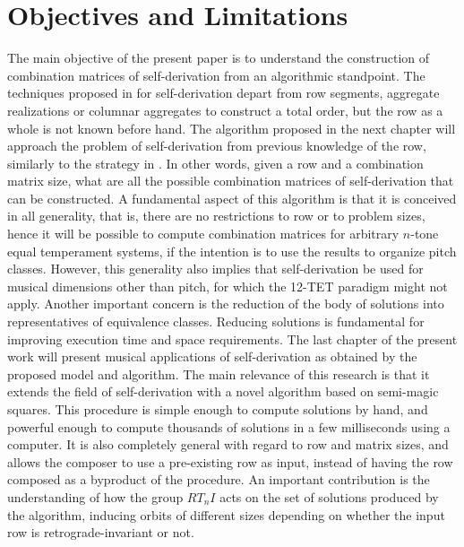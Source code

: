 
\section{Objectives and Limitations}

The main objective of the present paper is to understand the construction of combination matrices of self-derivation from an algorithmic standpoint. The techniques proposed in \cite{Starr1984} for self-derivation depart from row segments, aggregate realizations or columnar aggregates to construct a total order, but the row as a whole is not known before hand. The algorithm proposed in the next chapter will approach the problem of self-derivation from previous knowledge of the row, similarly to the strategy in \cite{Kowalski1987b}. In other words, given a row and a combination matrix size, what are all the possible combination matrices of self-derivation that can be constructed. A fundamental aspect of this algorithm is that it is conceived in all generality, that is, there are no restrictions to row or to problem sizes, hence it will be possible to compute combination matrices for arbitrary $n$-tone equal temperament systems, if the intention is to use the results to organize pitch classes. However, this generality also implies that self-derivation be used for musical dimensions other than pitch, for which the 12-TET paradigm might not apply. Another important concern is the reduction of the body of solutions into representatives of equivalence classes. Reducing solutions is fundamental for improving execution time and space requirements. The last chapter of the present work will present musical applications of self-derivation as obtained by the proposed model and algorithm. The main relevance of this research is that it extends the field of self-derivation with a novel algorithm based on semi-magic squares. This procedure is simple enough to compute solutions by hand, and powerful enough to compute thousands of solutions in a few milliseconds using a computer. It is also completely general with regard to row and matrix sizes, and allows the composer to use a pre-existing row as input, instead of having the row composed as a byproduct of the procedure. An important contribution is the understanding of how the group $RT_nI$ acts on the set of solutions produced by the algorithm, inducing orbits of different sizes depending on whether the input row is retrograde-invariant or not.

